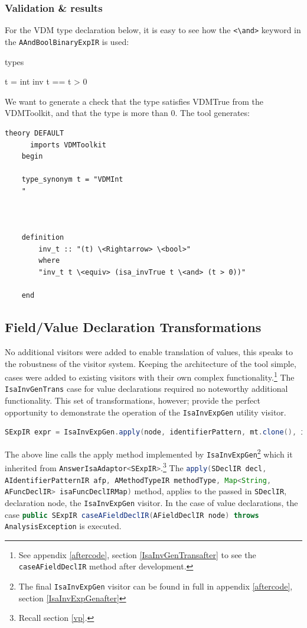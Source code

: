 	\subsubsection{Validation \& results}
	For the VDM type declaration below, it is easy to see how the \lstinline[language=Velocity]{<\and>} keyword in the \lstinline[language=Velocity]{AAndBoolBinaryExpIR} is used:
	\begin{vdmsl}
	types

	t = int
	inv t == t > 0
	\end{vdmsl}
	We want to generate a check that the type satisfies VDMTrue from the VDMToolkit, and that the type is more than 0. The tool generates:
	\begin{lstlisting}[language=Isabelle, mathescape]
	theory DEFAULT
	  imports VDMToolkit
	begin

	type_synonym t = "VDMInt
	"



	definition
		inv_t :: "(t) \<Rightarrow> \<bool>"
	    where
	    "inv_t t \<equiv> (isa_invTrue t \<and> (t > 0))"

	end
	\end{lstlisting}

	\subsection{Field/Value Declaration Transformations}
	No additional visitors were added to enable translation of values, this speaks to the robustness of the visitor system. Keeping the architecture of the tool simple, cases were added to existing visitors with their own complex functionality.\footnote{See appendix \ref{aftercode}, section \ref{IsaInvGenTransafter} to see the \lstinline[language=Java]{caseAFieldDeclIR} method after development.} The \lstinline[language=Java]{IsaInvGenTrans} case for value declarations required no noteworthy additional functionality. This set of transformations, however; provide the perfect opportunity to demonstrate the operation of the \lstinline[language=Java]{IsaInvExpGen} utility visitor. 
	\begin{lstlisting}[language=Java]
	SExpIR expr = IsaInvExpGen.apply(node, identifierPattern, mt.clone(), isaFuncDeclIRMap);
	\end{lstlisting}
	The above line calls the apply method implemented by \lstinline[language=Java]{IsaInvExpGen}\footnote{The final \lstinline[language=Java]{IsaInvExpGen} visitor can be found in full in appendix \ref{aftercode}, section \ref{IsaInvExpGenafter}} which it inherited from \lstinline[language=Java]{AnswerIsaAdaptor<SExpIR>}.\footnote{Recall section \ref{vp}.} The \lstinline[language=Java]{apply(SDeclIR decl, AIdentifierPatternIR afp, AMethodTypeIR methodType, Map<String, AFuncDeclIR> isaFuncDeclIRMap)} method, applies to the passed in \lstinline[language=Java]{SDeclIR}, declaration node, the \lstinline[language=Java]{IsaInvExpGen} visitor. In the case of value declarations, the case \lstinline[language=Java]{public SExpIR caseAFieldDeclIR(AFieldDeclIR node) throws AnalysisException} is executed. 

